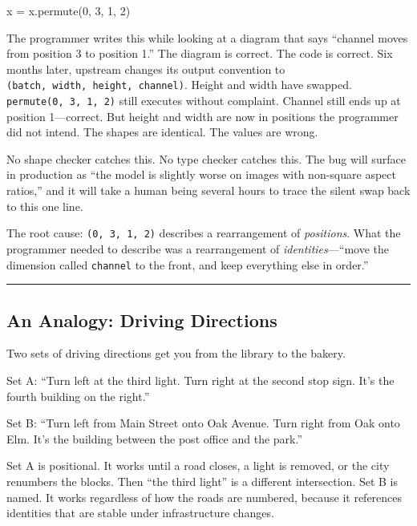 \documentclass[11pt,]{article}
\newenvironment{Shaded}{}{}
\newcommand{\DecValTok}[1]{\textcolor[rgb]{0.25,0.63,0.44}{#1}}
\newcommand{\NormalTok}[1]{#1}
\newcommand{\OperatorTok}[1]{\textcolor[rgb]{0.40,0.40,0.40}{#1}}
\begin{document}
\begin{Shaded}
\begin{Highlighting}[]
\NormalTok{x }\OperatorTok{=}\NormalTok{ x.permute(}\DecValTok{0}\NormalTok{, }\DecValTok{3}\NormalTok{, }\DecValTok{1}\NormalTok{, }\DecValTok{2}\NormalTok{)}
\end{Highlighting}
\end{Shaded}

The programmer writes this while looking at a diagram that says
``channel moves from position 3 to position 1.'' The diagram is correct.
The code is correct. Six months later, upstream changes its output
convention to \texttt{(batch,\ width,\ height,\ channel)}. Height and
width have swapped. \texttt{permute(0,\ 3,\ 1,\ 2)} still executes
without complaint. Channel still ends up at position 1---correct. But
height and width are now in positions the programmer did not intend. The
shapes are identical. The values are wrong.

No shape checker catches this. No type checker catches this. The bug
will surface in production as ``the model is slightly worse on images
with non-square aspect ratios,'' and it will take a human being several
hours to trace the silent swap back to this one line.

The root cause: \texttt{(0,\ 3,\ 1,\ 2)} describes a rearrangement of
\emph{positions}. What the programmer needed to describe was a
rearrangement of \emph{identities}---``move the dimension called
\texttt{channel} to the front, and keep everything else in order.''

\begin{center}\rule{0.5\linewidth}{0.4pt}\end{center}

\hypertarget{an-analogy-driving-directions}{%
\subsection{An Analogy: Driving
Directions}\label{an-analogy-driving-directions}}

Two sets of driving directions get you from the library to the bakery.

Set A: ``Turn left at the third light. Turn right at the second stop
sign. It's the fourth building on the right.''

Set B: ``Turn left from Main Street onto Oak Avenue. Turn right from Oak
onto Elm. It's the building between the post office and the park.''

Set A is positional. It works until a road closes, a light is removed,
or the city renumbers the blocks. Then ``the third light'' is a
different intersection. Set B is named. It works regardless of how the
roads are numbered, because it references identities that are stable
under infrastructure changes.
\end{document}
